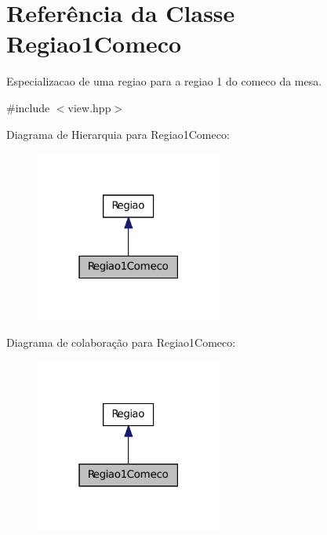 \hypertarget{classRegiao1Comeco}{
\section{Referência da Classe Regiao1Comeco}
\label{classRegiao1Comeco}
}


Especializacao de uma regiao para a regiao 1 do comeco da mesa.  




{\ttfamily \#include $<$view.hpp$>$}



Diagrama de Hierarquia para Regiao1Comeco:\nopagebreak
\begin{figure}[H]
\begin{center}
\leavevmode
\includegraphics[width=174pt]{classRegiao1Comeco__inherit__graph}
\end{center}
\end{figure}


Diagrama de colaboração para Regiao1Comeco:\nopagebreak
\begin{figure}[H]
\begin{center}
\leavevmode
\includegraphics[width=174pt]{classRegiao1Comeco__coll__graph}
\end{center}
\end{figure}
